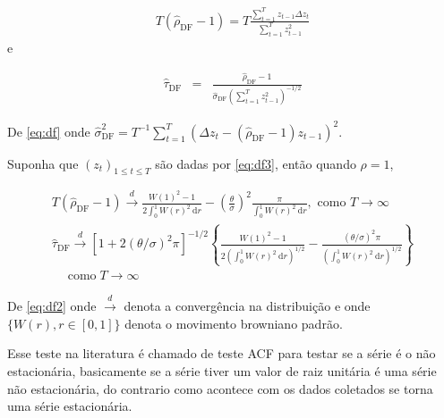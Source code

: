 \begin{eqnarray}
	T\left(\hat{\rho}_{\mathrm{DF}}-1\right)=T \frac{\sum_{t=1}^T z_{t-1} \Delta z_t}{\sum_{t=1}^T z_{t-1}^2}
\end{eqnarray}
e


\begin{eqnarray}
	\hat{\tau}_{\mathrm{DF}}&=&\frac{\hat{\rho}_{\mathrm{DF}}-1}{\hat{\sigma}_{\mathrm{DF}}\left(\sum_{t=1}^T z_{t-1}^2\right)^{-1 / 2}} \label{eq:df}
\end{eqnarray}

De \eqref{eq:df} onde $\hat{\sigma}_{\mathrm{DF}}^2=T^{-1} \sum_{t=1}^T\left(\Delta z_t-\left(\hat{\rho}_{\mathrm{DF}}-1\right) z_{t-1}\right)^2 .$



Suponha que $\left(z_t\right)_{1 \leq t \leq T}$ são dadas por \eqref{eq:df3}, então quando $\rho=1$,


\begin{eqnarray}
	T\left(\hat{\rho}_{\mathrm{DF}}-1\right) \stackrel{d}{\longrightarrow} \frac{W(1)^2-1}{2 \int_0^1 W(r)^2 \mathrm{~d} r}-\left(\frac{\theta}{\sigma}\right)^2 \frac{\pi}{\int_0^1 W(r)^2 \mathrm{~d} r}, \text { como } T \rightarrow \infty \\
	\hat{\tau}_{\mathrm{DF}} \stackrel{d}{\longrightarrow}\left[1+2(\theta / \sigma)^2 \pi\right]^{-1 / 2}\left\{\frac{W(1)^2-1}{2\left(\int_0^1 W(r)^2 \mathrm{~d} r\right)^{1 / 2}}-\frac{(\theta / \sigma)^2 \pi}{\left(\int_0^1 W(r)^2 \mathrm{~d} r\right)^{1 / 2}}\right\} \\
	\quad \operatorname{como} T \rightarrow \infty\label{eq:df2}
\end{eqnarray}


De \eqref{eq:df2} onde $\stackrel{d}{\longrightarrow}$ denota a convergência na distribuição e onde $\{W(r), r \in[0,1]\}$ denota o movimento browniano padrão.

Esse teste na literatura é chamado de teste ACF para testar se a série é o não estacionária, basicamente se a série tiver um valor de raiz unitária é uma série não estacionária, do contrario como acontece com os dados coletados se torna uma série estacionária.


